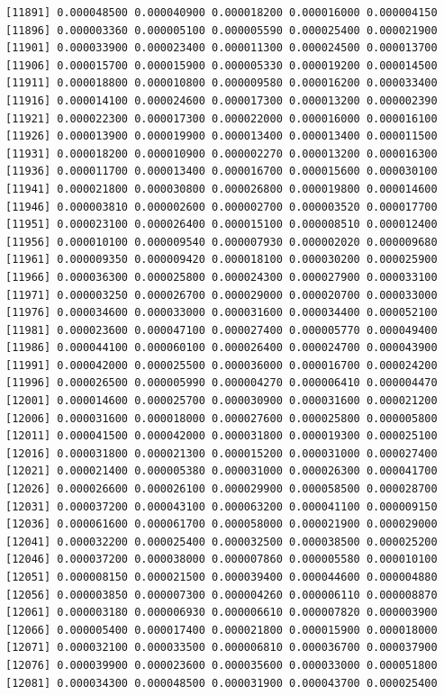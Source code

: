 \documentclass[]{article}
\begin{document}
\begin{verbatim}
[11891] 0.000048500 0.000040900 0.000018200 0.000016000 0.000004150
[11896] 0.000003360 0.000005100 0.000005590 0.000025400 0.000021900
[11901] 0.000033900 0.000023400 0.000011300 0.000024500 0.000013700
[11906] 0.000015700 0.000015900 0.000005330 0.000019200 0.000014500
[11911] 0.000018800 0.000010800 0.000009580 0.000016200 0.000033400
[11916] 0.000014100 0.000024600 0.000017300 0.000013200 0.000002390
[11921] 0.000022300 0.000017300 0.000022000 0.000016000 0.000016100
[11926] 0.000013900 0.000019900 0.000013400 0.000013400 0.000011500
[11931] 0.000018200 0.000010900 0.000002270 0.000013200 0.000016300
[11936] 0.000011700 0.000013400 0.000016700 0.000015600 0.000030100
[11941] 0.000021800 0.000030800 0.000026800 0.000019800 0.000014600
[11946] 0.000003810 0.000002600 0.000002700 0.000003520 0.000017700
[11951] 0.000023100 0.000026400 0.000015100 0.000008510 0.000012400
[11956] 0.000010100 0.000009540 0.000007930 0.000002020 0.000009680
[11961] 0.000009350 0.000009420 0.000018100 0.000030200 0.000025900
[11966] 0.000036300 0.000025800 0.000024300 0.000027900 0.000033100
[11971] 0.000003250 0.000026700 0.000029000 0.000020700 0.000033000
[11976] 0.000034600 0.000033000 0.000031600 0.000034400 0.000052100
[11981] 0.000023600 0.000047100 0.000027400 0.000005770 0.000049400
[11986] 0.000044100 0.000060100 0.000026400 0.000024700 0.000043900
[11991] 0.000042000 0.000025500 0.000036000 0.000016700 0.000024200
[11996] 0.000026500 0.000005990 0.000004270 0.000006410 0.000004470
[12001] 0.000014600 0.000025700 0.000030900 0.000031600 0.000021200
[12006] 0.000031600 0.000018000 0.000027600 0.000025800 0.000005800
[12011] 0.000041500 0.000042000 0.000031800 0.000019300 0.000025100
[12016] 0.000031800 0.000021300 0.000015200 0.000031000 0.000027400
[12021] 0.000021400 0.000005380 0.000031000 0.000026300 0.000041700
[12026] 0.000026600 0.000026100 0.000029900 0.000058500 0.000028700
[12031] 0.000037200 0.000043100 0.000063200 0.000041100 0.000009150
[12036] 0.000061600 0.000061700 0.000058000 0.000021900 0.000029000
[12041] 0.000032200 0.000025400 0.000032500 0.000038500 0.000025200
[12046] 0.000037200 0.000038000 0.000007860 0.000005580 0.000010100
[12051] 0.000008150 0.000021500 0.000039400 0.000044600 0.000004880
[12056] 0.000003850 0.000007300 0.000004260 0.000006110 0.000008870
[12061] 0.000003180 0.000006930 0.000006610 0.000007820 0.000003900
[12066] 0.000005400 0.000017400 0.000021800 0.000015900 0.000018000
[12071] 0.000032100 0.000033500 0.000006810 0.000036700 0.000037900
[12076] 0.000039900 0.000023600 0.000035600 0.000033000 0.000051800
[12081] 0.000034300 0.000048500 0.000031900 0.000043700 0.000025400

\end{verbatim}
\end{document}

